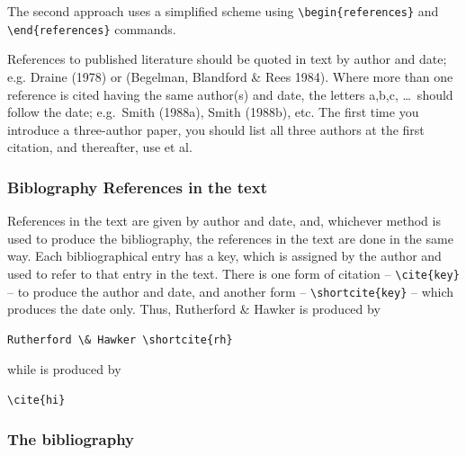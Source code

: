 \documentclass{gji}
\begin{document}
The second approach uses a simplified scheme using
\verb"\begin{references}" and \verb"\end{references}" commands.

References to published literature should be quoted in text by author
and date; e.g. Draine (1978) or (Begelman, Blandford \& Rees 1984).
Where more than one reference is cited having the same author(s) and date,
the letters a,b,c, \ldots\ should follow the date; e.g.\ Smith (1988a),
Smith (1988b), etc.
The first time you introduce a three-author paper, you should list all
three authors at the first citation, and thereafter, use et al.\vspace*{-5pt}

\subsubsection{Biblography References in the text}

References in the text are given by author and date, and, whichever
method is used to produce the bibliography, the references in the text
are done in the same way. Each bibliographical entry has a key, which
is assigned by the author and used to refer to that entry in the text.
There is one form of citation -- \verb"\cite{key}" -- to produce the
author and date, and another form -- \verb"\shortcite{key}" -- which
produces the date only. Thus, Rutherford \& Hawker  is
produced by
\begin{verbatim}
Rutherford \& Hawker \shortcite{rh}
\end{verbatim}
while \cite{hi} is produced by
\begin{verbatim}
\cite{hi}
\end{verbatim}

\subsubsection{The bibliography}
\end{document}
